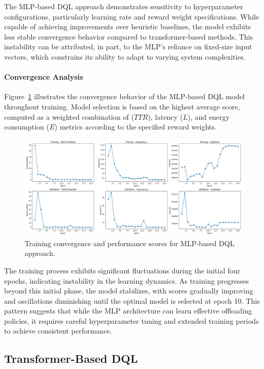 \documentclass[preprint,3p,authoryear]{elsarticle}
\begin{document}
The MLP-based DQL approach demonstrates sensitivity to hyperparameter configurations, particularly learning rate and reward weight specifications. While capable of achieving improvements over heuristic baselines, the model exhibits less stable convergence behavior compared to transformer-based methods. This instability can be attributed, in part, to the MLP's reliance on fixed-size input vectors, which constrains its ability to adapt to varying system complexities.

\paragraph{Convergence Analysis}

Figure~\ref{fig:mlp-score-plot} illustrates the convergence behavior of the MLP-based DQL model throughout training. Model selection is based on the highest average score, computed as a weighted combination of ($TTR$), latency ($L$), and energy consumption ($E$) metrics according to the specified reward weights.

\begin{figure}[H]
    \centering
    \includegraphics[width=1\linewidth]{figs/MLP/score_plot.png}
    \caption{Training convergence and performance scores for MLP-based DQL approach.}
    \label{fig:mlp-score-plot}
\end{figure}

The training process exhibits significant fluctuations during the initial four epochs, indicating instability in the learning dynamics. As training progresses beyond this initial phase, the model stabilizes, with scores gradually improving and oscillations diminishing until the optimal model is selected at epoch 10. This pattern suggests that while the MLP architecture can learn effective offloading policies, it requires careful hyperparameter tuning and extended training periods to achieve consistent performance.

\subsection{Transformer-Based DQL}\label{subsec:transformer_perf}
\end{document}
